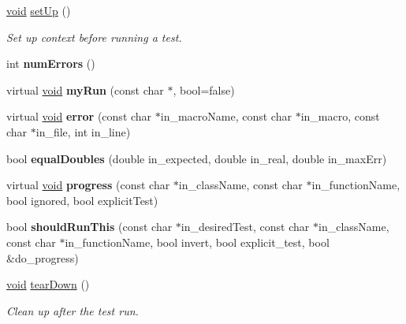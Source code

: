 \begin{DoxyCompactItemize}
\item 
\mbox{\label{class_test_case_a7fa9343edf139c341bf95c2d9a0304fb}} 
\hyperlink{interfacevoid}{void} \hyperlink{class_test_case_a7fa9343edf139c341bf95c2d9a0304fb}{set\+Up} ()
\begin{DoxyCompactList}\small\item\em Set up context before running a test. \end{DoxyCompactList}\item 
\mbox{\label{class_test_case_a649eaeccff30326e9895d17eb38f60bc}} 
int {\bfseries num\+Errors} ()
\item 
\mbox{\label{class_test_case_aee22746da06ee739a8ccf5754b45edfa}} 
virtual \hyperlink{interfacevoid}{void} {\bfseries my\+Run} (const char $\ast$, bool=false)
\item 
\mbox{\label{class_test_case_a367e6848478e834b914aac16df98782f}} 
virtual \hyperlink{interfacevoid}{void} {\bfseries error} (const char $\ast$in\+\_\+macro\+Name, const char $\ast$in\+\_\+macro, const char $\ast$in\+\_\+file, int in\+\_\+line)
\item 
\mbox{\label{class_test_case_a1fb2bc14cadeebcc7febd17511bed70d}} 
bool {\bfseries equal\+Doubles} (double in\+\_\+expected, double in\+\_\+real, double in\+\_\+max\+Err)
\item 
\mbox{\label{class_test_case_aa704bae9913329528dcb488ebd983eb9}} 
virtual \hyperlink{interfacevoid}{void} {\bfseries progress} (const char $\ast$in\+\_\+class\+Name, const char $\ast$in\+\_\+function\+Name, bool ignored, bool explicit\+Test)
\item 
\mbox{\label{class_test_case_aa7bbc1f4fecd0dfc8807596ede6b1142}} 
bool {\bfseries should\+Run\+This} (const char $\ast$in\+\_\+desired\+Test, const char $\ast$in\+\_\+class\+Name, const char $\ast$in\+\_\+function\+Name, bool invert, bool explicit\+\_\+test, bool \&do\+\_\+progress)
\item 
\mbox{\label{class_test_case_ad77983de749c3790ef79807cd301a2f7}} 
\hyperlink{interfacevoid}{void} \hyperlink{class_test_case_ad77983de749c3790ef79807cd301a2f7}{tear\+Down} ()
\begin{DoxyCompactList}\small\item\em Clean up after the test run. \end{DoxyCompactList}\end{DoxyCompactItemize}
